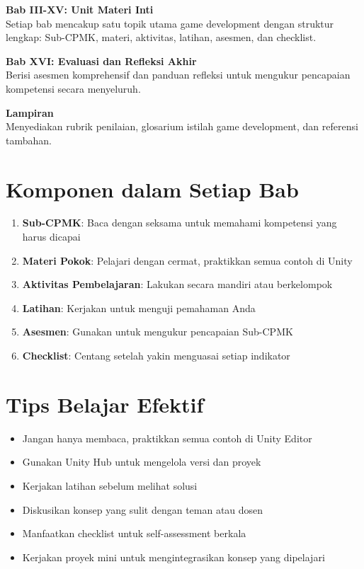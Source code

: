 \textbf{Bab III-XV: Unit Materi Inti}\\
Setiap bab mencakup satu topik utama game development dengan struktur lengkap: Sub-CPMK, materi, aktivitas, latihan, asesmen, dan checklist.

\textbf{Bab XVI: Evaluasi dan Refleksi Akhir}\\
Berisi asesmen komprehensif dan panduan refleksi untuk mengukur pencapaian kompetensi secara menyeluruh.

\textbf{Lampiran}\\
Menyediakan rubrik penilaian, glosarium istilah game development, dan referensi tambahan.

\section*{Komponen dalam Setiap Bab}

\begin{enumerate}
  \item \textbf{Sub-CPMK}: Baca dengan seksama untuk memahami kompetensi yang harus dicapai
  \item \textbf{Materi Pokok}: Pelajari dengan cermat, praktikkan semua contoh di Unity
  \item \textbf{Aktivitas Pembelajaran}: Lakukan secara mandiri atau berkelompok
  \item \textbf{Latihan}: Kerjakan untuk menguji pemahaman Anda
  \item \textbf{Asesmen}: Gunakan untuk mengukur pencapaian Sub-CPMK
  \item \textbf{Checklist}: Centang setelah yakin menguasai setiap indikator
\end{enumerate}

\section*{Tips Belajar Efektif}

\begin{itemize}
  \item Jangan hanya membaca, praktikkan semua contoh di Unity Editor
  \item Gunakan Unity Hub untuk mengelola versi dan proyek
  \item Kerjakan latihan sebelum melihat solusi
  \item Diskusikan konsep yang sulit dengan teman atau dosen
  \item Manfaatkan checklist untuk self-assessment berkala
  \item Kerjakan proyek mini untuk mengintegrasikan konsep yang dipelajari
\end{itemize}

